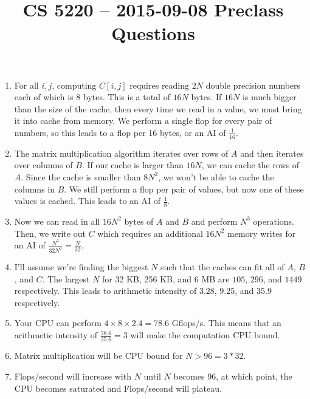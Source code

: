 \documentclass{hw}
\title{CS 5220 -- 2015-09-08 Preclass Questions}
\begin{document}
\maketitle{}

\begin{enumerate}
  \item
    For all $i,j$, computing $C[i, j]$ requires reading $2N$ double precision
    numbers each of which is 8 bytes. This is a total of $16N$ bytes.  If $16N$
    is much bigger than the size of the cache, then every time we read in a
    value, we must bring it into cache from memory. We perform a single flop
    for every pair of numbers, so this leads to a flop per 16 bytes, or an AI
    of $\frac{1}{16}$.

  \item
    The matrix multiplication algorithm iterates over rows of $A$ and then
    iterates over columns of $B$. If our cache is larger than $16N$, we can
    cache the rows of $A$. Since the cache is smaller than $8N^2$, we won't be
    able to cache the columns in $B$. We still perform a flop per pair of
    values, but now one of these values is cached. This leads to an AI of
    $\frac{1}{8}$.

  \item
    Now we can read in all $16N^2$ bytes of $A$ and $B$ and perform $N^3$
    operations. Then, we write out $C$ which requires an additional $16N^2$
    memory writes for an AI of $\frac{N^3}{32N^2} = \frac{N}{32}$.

  \item
    I'll assume we're finding the biggest $N$ such that the caches can fit all
    of $A$, $B$, and $C$. The largest $N$ for  32 KB, 256 KB, and 6 MB are
    $105$, $296$, and $1449$ respectively. This leads to arithmetic intensity
    of $3.28$, $9.25$, and $35.9$ respectively.

  \item
    Your CPU can perform $4 \times 8 \times 2.4 = 78.6$ Gflops/s. This means
    that an arithmetic intensity of $\frac{78.6}{25.6} = 3$ will make the
    computation CPU bound.

  \item
    Matrix multiplication will be CPU bound for $N > 96 = 3 * 32$.

  \item
    Flops/second will increase with $N$ until $N$ becomes 96, at which point,
    the CPU becomes saturated and Flops/second will plateau.
\end{enumerate}
\end{document}
